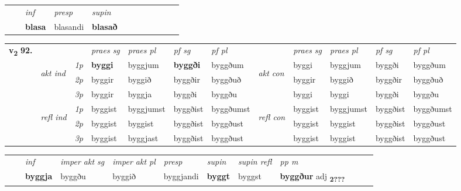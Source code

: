 \begin{tabular}{llllllllllll}
 & & \textit{inf}     & \textit{presp} & \textit{supin}       \\*
  & & \textbf{blasa}      & blasandi &  \textbf{blasað}   \\*
\cmidrule{1-12}
\end{tabular}



\begin{tabular}{llllllllllll} \toprule
\multirow{4}{*}{{{\textbf{v{\textsubscript{2}}} \Large{\textbf{92.}}}}}  & &   &  \textit{praes sg}  & \textit{praes pl}  &\textit{ pf sg} & \textit{pf pl} &  &  \textit{praes sg}  & \textit{praes pl}  & \textit{pf sg} & \textit{pf pl } \\*
	\cmidrule{4-7} \cmidrule{9-12}
 & \multirow{3}{*}{\begin{turn}{90}\textit{akt ind}\end{turn}} & {\textit{1p}} & \textbf{byggi} & byggjum    & \textbf{byggði} & byggðum & \multirow{3}{*}{\begin{turn}{90}\textit{akt con}\end{turn}} &byggi & byggjum & byggði & byggðum\\*
& &  {\textit{2p}} &  byggir  & byggið   & byggðir & byggðuð & & byggir & byggið & byggðir & byggðuð \\*
& &  {\textit{3p}} & byggir & byggja   & byggði & byggðu & & byggi & byggi& byggði & byggðu  \\*
\cmidrule{4-7} \cmidrule{9-12}
 &\multirow{3}{*}{\begin{turn}{90}\textit{refl ind}\end{turn}} & {\textit{1p}} & byggist & byggjumst    & byggðist & byggðumst & \multirow{3}{*}{\begin{turn}{90}\textit{refl con}\end{turn}}  &byggist & byggjumst & byggðist & byggðumst\\*
 &&  {\textit{2p}} &  byggist  & byggist   & byggðist & byggðust & &byggist & byggist & byggðist & byggðust \\*
& &  {\textit{3p}} & byggist & byggjast   & byggðist & byggðust & & byggist & byggist& byggðist & byggðust  \\*
\cmidrule{4-7} \cmidrule{9-12}
\end{tabular}


\begin{tabular}{llllllllllll}
 & & \textit{inf} & \textit{imper akt sg} & \textit{imper akt pl}   & \textit{presp} & \textit{supin} & \textit{supin refl} & \textit{pp m}     \\*
  & & \textbf{byggja} & byggðu  & byggið   & byggjandi &  \textbf{byggt} & byggst & \textbf{byggður} adj \textbf{\textsubscript{2???}} \\*
\cmidrule{1-12}
\end{tabular}



